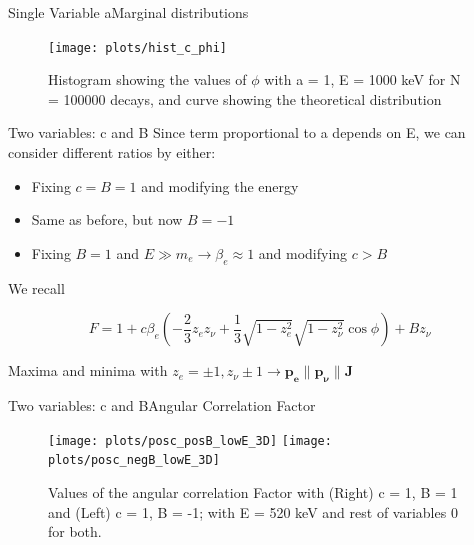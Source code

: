 \documentclass{beamer}
\begin{document}
\begin{frame}{Single Variable a}{Marginal distributions}
	
	\begin{figure}
		\centering
		\texttt{[image: plots/hist\_c\_phi]}
		\caption{Histogram showing the values of $\phi$ with a = 1, E = 1000 keV for N = 100000 decays, and curve showing the theoretical distribution}
	\end{figure}
\end{frame}
\begin{frame}{Two variables: c and B}
	Since term proportional to a depends on E, we can consider different ratios by either:
	\begin{itemize}
		\item Fixing $c = B = 1$ and modifying the energy
		\item Same as before, but now $B = -1$
		\item Fixing $B = 1$ and $E \gg m_e \rightarrow \beta_e \approx 1$ and modifying $c > B$
	\end{itemize}
	
	We recall
	
	$$F = 1 + c\beta_e\left(-\frac 23 z_ez_\nu + \frac 13 \sqrt{1-z^2_e}\sqrt{1-z^2_\nu}\cos \phi\right) + Bz_\nu$$
	
	Maxima and minima with $z_e=\pm1,z_\nu \pm1 \rightarrow \boldsymbol{p_e} \parallel \boldsymbol{p_\nu} \parallel \boldsymbol{J}$  
	
\end{frame}
\begin{frame}{Two variables: c and B}{Angular Correlation Factor}
	\begin{figure}
		\centering
		\texttt{[image: plots/posc\_posB\_lowE\_3D]}
		\texttt{[image: plots/posc\_negB\_lowE\_3D]}
		\caption{Values of the angular correlation Factor with (Right) c = 1, B = 1 and (Left) c = 1, B = -1; with E = 520 keV and rest of variables 0 for both.}
	\end{figure}
\end{frame}
\end{document}
